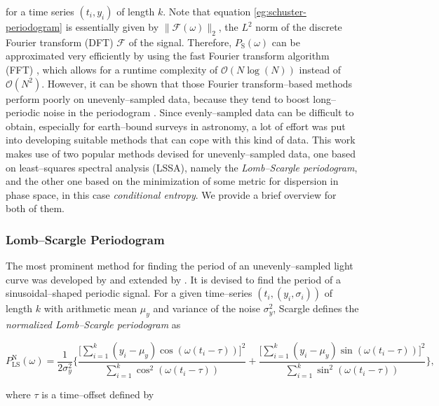 for a time series $(t_i, y_i)$ of length $k$. Note that equation \eqref{eg:schuster-periodogram} is essentially given by $\| \mathcal{F}(\omega) \|_2 $, the $L^2$ norm of the discrete Fourier transform (DFT) $\mathcal{F}$ of the signal. Therefore, $P_{\text{S}}(\omega)$ can be approximated very efficiently by using the fast Fourier transform algorithm (FFT) \citep{cooley1965}, which allows for a runtime complexity of $\mathcal{O}(N\log{(N)})$ instead of $\mathcal{O}(N^2)$. However, it can be shown that those Fourier transform--based methods perform poorly on unevenly--sampled data, because they tend to boost long--periodic noise in the periodogram \citep{hastie2001}. Since evenly--sampled data can be difficult to obtain, especially for earth--bound surveys in astronomy, a lot of effort was put into developing suitable methods that can cope with this kind of data. This work makes use of two popular methods devised for unevenly--sampled data, one based on least--squares spectral analysis (LSSA), namely the \emph{Lomb--Scargle periodogram}, and the other one based on the minimization of some metric for dispersion in phase space, in this case \emph{conditional entropy}. We provide a brief overview for both of them.

\subsubsection{Lomb--Scargle Periodogram}
\label{subsubsec:lomb-scargle}

The most prominent method for finding the period of an unevenly--sampled light curve was developed by \citet{lomb1976} and extended by \citet{scargle1982}. It is devised to find the period of a sinusoidal--shaped periodic signal. For a given time--series $(t_i, (y_i, \sigma_i))$ of length $k$ with arithmetic mean $\mu_y$ and variance of the noise $\sigma_y^2$, Scargle defines the \emph{normalized Lomb--Scargle periodogram} as

\begin{equation}
\label{eq:normalized-lomb-scargle}
P^{\text{N}}_{\text{LS}}(\omega) = \frac{1}{2 \sigma_y^2} \Bigg\{ \frac{\big[\sum\limits_{i=1}^k (y_i - \mu_y) \cos(\omega(t_i - \tau))\big]^2}{\sum\limits_{i=1}^k \cos^2(\omega(t_i - \tau))} + \frac{\big[\sum\limits_{i=1}^k (y_i - \mu_y) \sin(\omega(t_i - \tau))\big]^2}{\sum\limits_{i=1}^k \sin^2(\omega(t_i - \tau))}\Bigg\},
\end{equation}

where $\tau$ is a time--offset defined by

